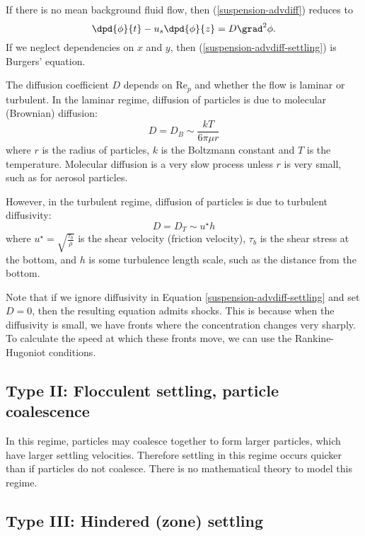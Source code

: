 If there is no mean background fluid flow, then (\ref{suspension-advdiff}) reduces to
\begin{equation}
    \dpd{\phi}{t} - u_s\dpd{\phi}{z} = D\grad^2\phi.
    \label{suspension-advdiff-settling}
\end{equation}
If we neglect dependencies on $x$ and $y$, then (\ref{suspension-advdiff-settling}) is Burgers' equation. 

The diffusion coefficient $D$ depends on $\mathrm{Re}_p$ and whether the flow is laminar or turbulent. In the laminar regime, diffusion of particles is due to molecular (Brownian) diffusion: 
\begin{equation}
    D = D_B \sim \frac{kT}{6\pi\mu r}
\end{equation}
where $r$ is the radius of particles, $k$ is the Boltzmann constant and $T$ is the temperature. Molecular diffusion is a very slow process unless $r$ is very small, such as for aerosol particles.

However, in the turbulent regime, diffusion of particles is due to turbulent diffusivity:
\begin{equation}
    D = D_T \sim u^\star h
\end{equation}
where $u^\star = \sqrt{\frac{\tau_b}{\rho}}$ is the shear velocity (friction velocity), $\tau_b$ is the shear stress at the bottom, and $h$ is some turbulence length scale, such as the distance from the bottom.

Note that if we ignore diffusivity in Equation \ref{suspension-advdiff-settling} and set $D=0$, then the resulting equation admits shocks. This is because when the diffusivity is small, we have fronts where the concentration changes very sharply. To calculate the speed at which these fronts move, we can use the Rankine-Hugoniot conditions.

\subsection{Type II: Flocculent settling, particle coalescence}

In this regime, particles may coalesce together to form larger particles, which have larger settling velocities. Therefore settling in this regime occurs quicker than if particles do not coalesce. There is no mathematical theory to model this regime.

\subsection{Type III: Hindered (zone) settling}

